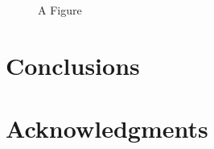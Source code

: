 \documentclass[12pt, a4paper, twoside, numbers=enddot, bibliography=totoc, listof=totoc, headings=optiontoheadandtoc]{uniudthesis}
\begin{document}
					\begin{figure}[h!]
						\caption{A Figure}
					\end{figure}
					
					\begin{table}[h!]
						\caption{A Table}
					\end{table}
					
					\begin{table}[h!]
						\caption{A Table}
					\end{table}
	
	\backmatter
		\chapter{Conclusions}
		\chapter*{Acknowledgments}
\end{document}
